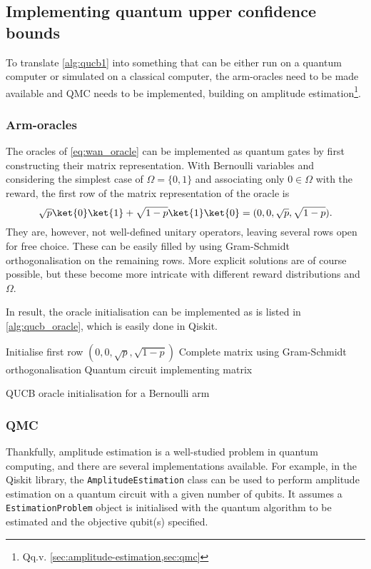 \subsection{Implementing quantum upper confidence bounds}
\label{sec:qucb-implementation}
To translate \cref{alg:qucb1} into something that can be either run on a quantum computer or simulated on a classical computer, the arm-oracles need to be made available and QMC needs to be implemented, building on amplitude estimation\footnote{Qq.v. \cref{sec:amplitude-estimation,sec:qmc}}.

\subsubsection{Arm-oracles}
The oracles of \cref{eq:wan_oracle} can be implemented as quantum gates by first constructing their matrix representation.
With Bernoulli variables and considering the simplest case of $\Omega = \{0, 1\}$ and associating only $0 \in \Omega$ with the reward, the first row of the matrix representation of the oracle is
\begin{equation}
    \sqrt{p} \ket{0} \ket{1} + \sqrt{1-p} \ket{1} \ket{0}
    =
    (0, 0, \sqrt{p}, \sqrt{1-p}).
\end{equation}
They are, however, not well-defined unitary operators, leaving several rows open for free choice.
These can be easily filled by using Gram-Schmidt orthogonalisation on the remaining rows.
More explicit solutions are of course possible, but these become more intricate with different reward distributions and $\Omega$.

In result, the oracle initialisation can be implemented as is listed in \cref{alg:qucb_oracle}, which is easily done in Qiskit.

\begin{algorithm}
    \SetAlgoLined
    Initialise first row $(0, 0, \sqrt{p}, \sqrt{1-p})$ \;
    Complete matrix using Gram-Schmidt orthogonalisation \;
    \Return Quantum circuit implementing matrix
    \caption{QUCB oracle initialisation for a Bernoulli arm}
    \label{alg:qucb_oracle}
\end{algorithm}

\subsubsection{QMC}
Thankfully, amplitude estimation is a well-studied problem in quantum computing, and there are several implementations available.
For example, in the Qiskit library, the \texttt{AmplitudeEstimation} class can be used to perform amplitude estimation on a quantum circuit with a given number of qubits.
It assumes a \texttt{EstimationProblem} object is initialised with the quantum algorithm to be estimated and the objective qubit(s) specified.

